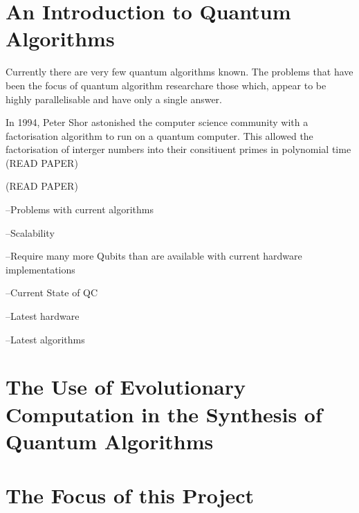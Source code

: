 \documentclass[authoryearcitations]{UoYCSproject}
\begin{document}
\section{An Introduction to Quantum Algorithms}

Currently there are very few quantum algorithms known.
The problems that have been the focus of quantum algorithm researchare those which, appear to be highly parallelisable and have only a single answer.

In 1994, Peter Shor astonished the computer science community with a factorisation algorithm to run on a quantum computer.
This allowed the factorisation of interger numbers into their consitiuent primes in polynomial time
(READ PAPER) 
	
(READ PAPER)

--Problems with current algorithms

	--Scalability
	
	--Require many more Qubits than are available with current hardware implementations


--Current State of QC
	
	--Latest hardware
	
	--Latest algorithms

\section{The Use of Evolutionary Computation in the Synthesis of Quantum Algorithms}

\section{The Focus of this Project}


\end{document}
